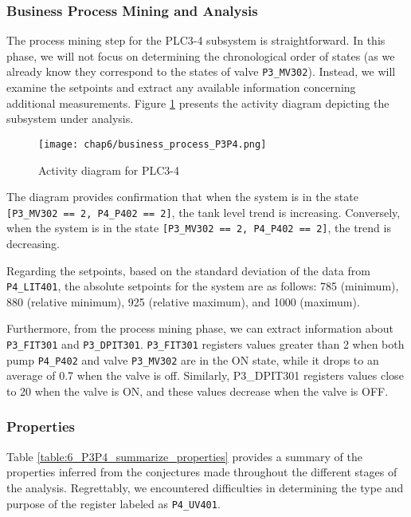 \subsubsection{Business Process Mining and Analysis}
\label{subsubsec:6_P3P4_bpa}

The process mining step for the PLC3-4 subsystem is straightforward. In this phase, we will not focus on determining the chronological order of states (as we already know they correspond to the states of valve \texttt{P3\_MV302}). Instead, we will examine the setpoints and extract any available information concerning additional measurements.
Figure \ref{fig:6_P3P4_process_mining} presents the activity diagram depicting the subsystem under analysis.

\begin{figure}[ht]
	\centering
	\texttt{[image: chap6/business\_process\_P3P4.png]}
	\caption{Activity diagram for PLC3-4}
	\label{fig:6_P3P4_process_mining}
\end{figure}

\bigskip
The diagram provides confirmation that when the system is in the state \texttt{[P3\_MV302 == 2, P4\_P402 == 2]}, the tank level trend is increasing. Conversely, when the system is in the state \texttt{[P3\_MV302 == 2, P4\_P402 == 2]}, the trend is decreasing.

\bigskip
Regarding the setpoints, based on the standard deviation of the data from \texttt{P4\_LIT401}, the absolute setpoints for the system are as follows: 785 (minimum), 880 (relative minimum), 925 (relative maximum), and 1000 (maximum).

\bigskip
Furthermore, from the process mining phase, we can extract information about \texttt{P3\_FIT301} and \texttt{P3\_DPIT301}. \texttt{P3\_FIT301} registers values greater than 2 when both pump \texttt{P4\_P402} and valve \texttt{P3\_MV302} are in the ON state, while it drops to an average of 0.7 when the valve is off. Similarly, P3\_DPIT301 registers values close to 20 when the valve is ON, and these values decrease when the valve is OFF.
\vfill

\subsubsection{Properties}
\label{subsubsec:6_P3P4_summary_table}

Table \ref{table:6_P3P4_summarize_properties} provides a summary of the properties inferred from the conjectures made throughout the different stages of the analysis. Regrettably, we encountered difficulties in determining the type and purpose of the register labeled as \texttt{P4\_UV401}.

